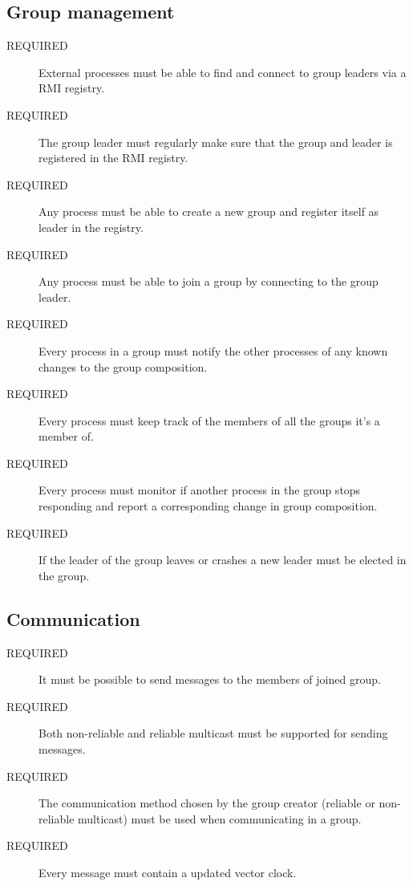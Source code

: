 \documentclass[english]{article}
\begin{document}
\subsection{Group management}
\begin{description}
\item[REQUIRED] External processes must be able to find and connect to group leaders via a RMI registry.

\item[REQUIRED] The group leader must regularly make sure that the group and leader is registered in the RMI registry.

\item[REQUIRED] Any process must be able to create a new group and register itself as leader in the registry.

\item[REQUIRED] Any process must be able to join a group by connecting to the group leader.

\item[REQUIRED] Every process in a group must notify the other processes of any known changes to the group composition.

\item[REQUIRED] Every process must keep track of the members of all the groups it's a member of.

\item[REQUIRED] Every process must monitor if another process in the group stops responding and report a corresponding change in group composition.

\item[REQUIRED] If the leader of the group leaves or crashes a new leader must be elected in the group.
\end{description}


\subsection{Communication}
\begin{description}
\item[REQUIRED] It must be possible to send messages to the members of joined group.

\item[REQUIRED] Both non-reliable and reliable multicast must be supported for sending messages.

\item[REQUIRED] The communication method chosen by the group creator (reliable or non-reliable multicast) must be used when communicating in a group.

\item[REQUIRED] Every message must contain a updated vector clock.
\end{description}
\end{document}
